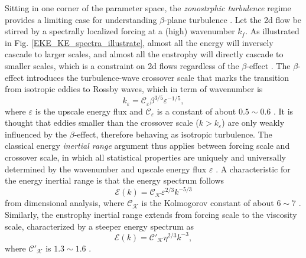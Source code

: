 \documentclass{ametsoc}
\begin{document}
Sitting in one corner of the parameter space, the \textit{zonostrphic turbulence} regime
provides a limiting case for understanding $\beta$-plane turbulence \citep{Sukoriansky2002,Galperin2010}.
Let the 2d flow be stirred by a spectrally localized forcing at a (high) wavenumber $k_{f}$.
As illustrated in Fig. \ref{EKE_KE_spectra_illustrate}, 
almost all the energy will inversely cascade
to larger scales, and almost all the enstrophy will directly cascade
to smaller scales, which is a constraint on 2d flows regardless of the $\beta$-effect \citep{Kraichnan1967,Charney1971}.
The $\beta$-effect introduces the turbulence-wave crossover scale that marks the transition from
isotropic eddies to Rossby waves, which in term of wavenumber is
\begin{equation}
    k_{\varepsilon}=\mathcal{\mathcal{C}_{\varepsilon}}\beta^{3/5}\varepsilon^{-1/5},\label{eq:classical_crossover_wavenumber}
\end{equation}
where $\varepsilon$ is the upscale energy flux and $\mathcal{\mathcal{C}_{\varepsilon}}$ is a constant of about
$0.5\sim0.6$ \citep{Vallis1993,Galperin2010,Smith2002}. It is thought that 
eddies smaller than the crossover scale ($k>k_{\varepsilon}$) are
only weakly influenced by the $\beta$-effect, therefore behaving as isotropic
turbulence. The classical energy \textit{inertial range} argument thus applies between
forcing scale and crossover scale, in which all statistical properties
are uniquely and universally determined by the wavenumber and upscale energy flux $\varepsilon$
\citep{Kraichnan1967,Boffetta2012,Vallis2006}. A characteristic for the energy inertial range
is that the energy spectrum follows
\begin{equation}
    \mathcal{E}(k)=\mathcal{C_{K}}\varepsilon^{2/3}k^{-5/3}\label{eq:Kolmogorov_Kraichnan_spectrum_energy}
\end{equation}
from dimensional analysis, where $\mathcal{C_{K}}$ is the Kolmogorov constant of about $6\sim7$
\citep{Maltrud1991,Smith1993,Paret1997,Chen2006,Borue1993,Gotoh1998}. Similarly, the 
enstrophy inertial range extends from forcing scale to the viscosity scale, characterized by
a steeper energy spectrum as
\begin{equation}
    \mathcal{E}(k)=\mathcal{C'_{K}}\eta^{2/3}k^{-3},\label{eq:Kolmogorov_Kraichnan_spectrum_enstrophy}
\end{equation}
where $\mathcal{C'_{K}}$ is $1.3\sim1.6$ \citep{Maltrud1991,Smith1993,Paret1997,Chen2006,Borue1993,Gotoh1998}.
\end{document}
